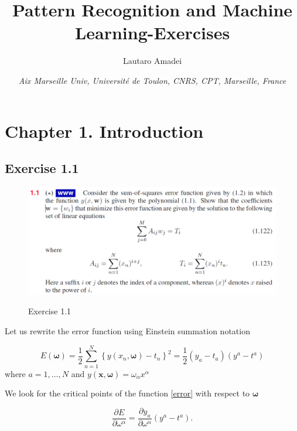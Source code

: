 \documentclass[11pt]{article}
\def\bo{\boldsymbol{\omega}}
\begin{document}
\title{\Large{\textbf{\sffamily Pattern Recognition and Machine Learning-Exercises}}}
\author{\sffamily Lautaro Amadei}
\date{\small{\textit{
Aix Marseille Univ, Universit\'e de Toulon, CNRS, CPT, Marseille, France}}}

\maketitle

\tableofcontents
\section{Chapter 1. Introduction}

\subsection{Exercise 1.1}
\begin{figure}[bth]
\centering
        {\includegraphics[width=\linewidth]{ex1.png}}
        \caption{Exercise 1.1}
        \label{ex1.1}
\end{figure}


Let us rewrite the error function using Einstein summation notation

\begin{equation}\label{error}
    E(\bo) = \frac{1}{2} \sum_{n = 1}^{N} \left\{ y(x_{n}, \bo) - t_{n} \right\}^2 = \frac{1}{2}\left( y_{a} - t_{a} \right) \left( y^{a} - t^{a} \right)
\end{equation}
where $a= 1, \dots, N$ and $y(\boldsymbol{x}, \bo) = \omega_{\alpha} x^{\alpha}$

We look for the critical points of the function \eqref{error} with respect to $\bo$

\begin{equation}
    \frac{\partial E}{\partial \omega^{\alpha}} = \frac{\partial y_{a}}{\partial \omega^{\alpha}} \left( y^{a} - t^{a} \right).
\end{equation}
\end{document}
